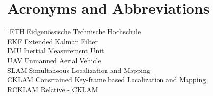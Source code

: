 \section*{Acronyms and Abbreviations}
\begin{tabbing}
 \hspace*{1.6cm}  \= \kill
 ETH \> Eidgenössische Technische Hochschule \\[0.5ex]
 EKF \> Extended Kalman Filter \\[0.5ex]
 IMU \> Inertial Measurement Unit \\[0.5ex]
 UAV \> Unmanned Aerial Vehicle \\[0.5ex]
 SLAM \> Simultaneous Localization and Mapping \\[0.5ex]
 CKLAM \> Constrained Key-frame based Localization and Mapping \\[0.5ex]
 RCKLAM \> Relative - CKLAM \\[0.5ex]
\end{tabbing}